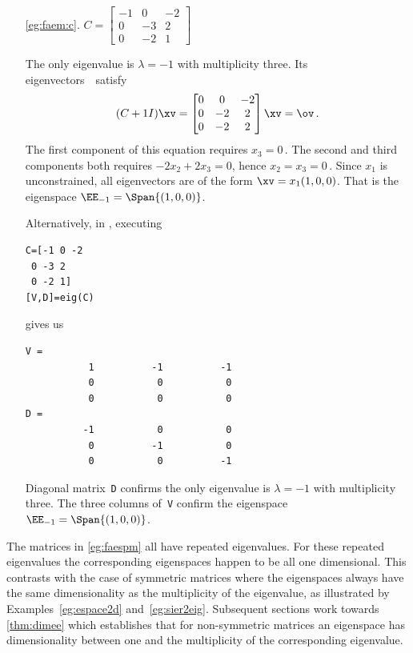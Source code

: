 \begin{example}
\begin{itemize}
\item[\ref{eg:faem:c}.]
\(C=\begin{bmatrix}-1&0&-2
\\0&-3&2
\\0&-2&1\end{bmatrix}\)
\begin{solution} 
The only eigenvalue is \(\lambda=-1\) with multiplicity three.
Its eigenvectors~\xv\ satisfy
\begin{equation*}
(C+1 I)\xv=\begin{bmatrix} 0&0&-2
\\0&-2&2
\\0&-2&2 \end{bmatrix}\xv=\ov\,.
\end{equation*}
The first component of this equation requires \(x_3=0\)\,.  
The second and third components both requires \(-2x_2+2x_3=0\), hence \(x_2=x_3=0\)\,.
Since \(x_1\) is unconstrained, all eigenvectors are of the form \(\xv=x_1(1,0,0)\).  
That is the eigenspace  \(\EE_{-1}=\Span\{(1,0,0)\}\).

Alternatively, in \script, executing 
\begin{verbatim}
C=[-1 0 -2
 0 -3 2
 0 -2 1]
[V,D]=eig(C)
\end{verbatim}
gives us
\begin{verbatim}
V =
           1          -1          -1
           0           0           0
           0           0           0
D =
          -1           0           0
           0          -1           0
           0           0          -1
\end{verbatim}
Diagonal matrix~\verb|D| confirms the only eigenvalue is \(\lambda=-1\) with multiplicity three.  
The three columns of~\verb|V| confirm the eigenspace \(\EE_{-1}=\Span\{(1,0,0)\}\).
\end{solution}

\end{itemize}
\end{example}

The matrices in \autoref{eg:faespm} all have repeated eigenvalues.  
For these repeated eigenvalues the corresponding eigenspaces happen to be all one dimensional.
This contrasts with the case of symmetric matrices where the eigenspaces always have the same dimensionality as the multiplicity of the eigenvalue, as illustrated by Examples~\ref{eg:espace2d} and~\ref{eg:sier2eig}.
Subsequent sections work towards \autoref{thm:dimee} which establishes that for non-symmetric matrices an eigenspace has dimensionality between one and the multiplicity of the corresponding eigenvalue.


